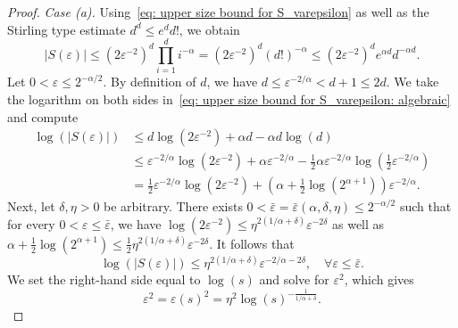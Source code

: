 \documentclass[namedate,webpdf]{ima-authoring-template-blank}
\newcommand{\abs}[1]{\left|#1\right|}
\numberwithin{counter}{section}
\numberwithin{equation}{section}
\theoremstyle{plain}
\theoremstyle{definition}
\theoremstyle{thmstyletwo}
\begin{document}
\begin{proof}
    \emph{Case (a).}
    Using~\eqref{eq: upper size bound for S_varepsilon} as well as the Stirling type estimate \(d^d \leq e^d d!\), we obtain
    \begin{equation}
    \label{eq: upper size bound for S_varepsilon: algebraic}
        \abs{S(\varepsilon)} \leq (2\varepsilon^{-2})^d \prod_{i=1}^d i^{-\alpha}
        = (2\varepsilon^{-2})^d (d!)^{-\alpha}
        \leq (2\varepsilon^{-2})^d e^{\alpha d} d^{-\alpha d}.
    \end{equation}
    Let \(0 < \varepsilon \leq 2^{- \alpha / 2}\). By definition of \(d\), we have \(d \leq \varepsilon^{-2/\alpha} < d + 1 \leq 2d\). We take the logarithm on both sides in~\eqref{eq: upper size bound for S_varepsilon: algebraic} and compute
    \begin{align*}
        \log(\abs{S(\varepsilon)}) 
        &\leq d \log(2 \varepsilon^{-2}) + \alpha d - \alpha d \log(d) \\
        &\leq \varepsilon^{-2/\alpha} \log(2\varepsilon^{-2}) 
        + \alpha \varepsilon^{-2/\alpha} 
        - \frac{1}{2} \alpha \varepsilon^{-2/\alpha} \log\left( \frac{1}{2} \varepsilon^{-2/\alpha} \right) \\
        &= \frac{1}{2} \varepsilon^{-2/\alpha} \log(2 \varepsilon^{-2})
        + \left(\alpha + \frac{1}{2} \log(2^{\alpha + 1})\right) \varepsilon^{-2/\alpha}.
    \end{align*}
    Next, let \(\delta, \eta > 0\) be arbitrary. There exists \(0 < \bar{\varepsilon} = \bar{\varepsilon} (\alpha, \delta, \eta) \leq 2^{- \alpha / 2}\) such that for every \(0 < \varepsilon \leq \bar{\varepsilon}\), we have \(\log(2 \varepsilon^{-2}) \leq \eta^{2(1/\alpha + \delta)} \varepsilon^{-2\delta}\) as well as \(\alpha + \frac{1}{2} \log(2^{\alpha + 1}) \leq \frac{1}{2} \eta^{2(1/\alpha + \delta)} \varepsilon^{-2 \delta}\). It follows that
    \begin{equation}
    \label{eq: log-size bound for S_varepsilon: algebraic}
        \log(\abs{S(\varepsilon)}) 
        \leq \eta^{2(1/\alpha + \delta)} \varepsilon^{-2/\alpha - 2\delta},
        \quad \forall \varepsilon \leq \bar{\varepsilon}.
    \end{equation}
    We set the right-hand side equal to \(\log(s)\) and solve for \(\varepsilon^2\), which gives
    \begin{equation}
    \label{eq: s-term: equation for varepsilon and s: algebraic}
        \varepsilon^2 = \varepsilon(s)^2 = \eta^2 \log(s)^{-\frac{1}{1/\alpha + \delta}}.
    \end{equation}

\end{proof}
\end{document}
